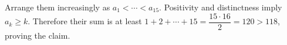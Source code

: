 Arrange them increasingly as $a_1<\cdots<a_{15}$. Positivity and distinctness imply $a_k\ge k$. Therefore their sum is at least $1+2+\cdots+15=\dfrac{15\cdot 16}{2}=120>118$, proving the claim.
